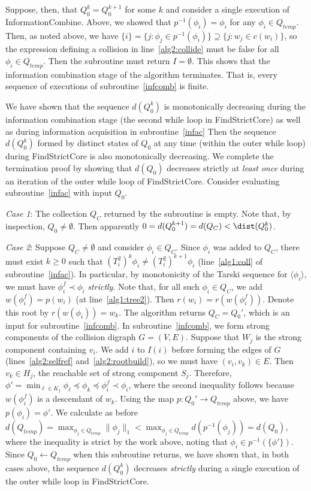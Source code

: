 \documentclass[11pt,reqno]{amsart}
\theoremstyle{definition}
\numberwithin{equation}{section}
\newcommand{\inv}{^{-1}}
\newcommand{\lag}{\langle}
\newcommand{\rag}{\rangle}
\newcommand{\pre}{\phi}
\newcommand{\peq}{\preceq}
\newcommand{\pe}{\prec}
\newcommand{\strongcomp}{S}
\newcommand{\acto}{Q_0}
\newcommand{\actok}{Q_0^k}
\newcommand{\actc}{Q_C}
\newcommand{\actt}{Q_{temp}}
\newcommand{\disto}{d}
\newcommand{\coll}{I}
\newcommand{\reach}{H}
\begin{document}
\begin{enumerate}
Suppose, then, that $\actok = \acto^{k+1}$ for some $k$ and consider a single execution of InformationCombine. 
Above, we showed that $p\inv(\pre_i) = \pre_i$ for any $\pre_i \in \actt$.
Then, as noted above, we have $\{i\} = \{j: \pre_j \in p\inv(\pre_i)\} \supseteq \{j: w_j \in c(w_i)\}$, so the expression defining a collision in line~\ref{alg2:collide} must be false for all $\pre_i \in \actt$. Then the subroutine must return $I = \emptyset$. 
This shows that the information combination stage of the algorithm terminates.
That is, every sequence of executions of subroutine~\ref{infcomb} is finite.

We have shown that the sequence $\disto(\actok)$ is monotonically decreasing during the information combination stage (the second while loop in FindStrictCore) as well as during information acquisition in subroutine~\ref{infac}
Then the sequence $\disto(\actok)$ formed by distinct states of $\acto$ at any time (within the outer while loop) during FindStrictCore is also monotonically decreasing.  
We complete the termination proof by showing that $\disto(\acto)$ decreases strictly at \emph{least once} during an iteration of the outer while loop of FindStrictCore. Consider evaluating subroutine~\ref{infac} with input $\acto$. 

\emph{Case 1}: The collection $\actc$ returned by the subroutine is empty. Note that, by inspection, $\acto \not = \emptyset$. 
Then apparently $0 = \disto(\acto^{k+1}) = \disto(\actc) < \dist(\actok)$. 

\emph{Case 2}: Suppose $\actc \not = \emptyset$ and consider $\pre_i \in \actc$.
Since $\pre_i$ was added to $\actc$, there must exist $k \geq 0$ such that $(T_i^2)^k \pre_i \not = (T_i^2)^{k+1} \pre_i$ (line~\ref{alg1:coll} of subroutine~\ref{infac}).  
In particular, by monotonicity of the Tarski sequence for $\lag \pre_i \rag$, we must have $\pre_i^f \pe \pre_i$ \emph{strictly}.
Note that, for all such $\pre_i \in \actc$, we add $w(\pre_i^f) = p(w_i)$ (at line~\ref{alg1:tree2}). Then $r(w_i) = r(w(\pre_i^f))$. Denote this root by $r(w(\pre_i))= w_k$. 
The algorithm returns $\actc = \acto'$, which is an input for subroutine~\ref{infcomb}.
In subroutine~\ref{infcomb}, we form strong components of the collision digraph $G = (V,E)$. 
Suppose that $W_j$ is the strong component containing $v_i$.
We add $i$ to $\coll(i)$ before forming the edges of $G$ (lines~\ref{alg2:selfref} and~\ref{alg2:rootbuild}), so we must have $(v_i,v_k) \in E$.
Then $v_k \in \reach_j$, the reachable set of strong component $\strongcomp_j$. 
Therefore, $\pre' = \min_{\ell \in K_j} \pre_{\ell} \peq \pre_k \peq \pre_i^f \pe \pre_i$, where the second inequality follows because $w(\pre_i^f)$ is a descendant of $w_k$. 
Using the map $p:\acto' \to \actt$ above, we have $p(\pre_i) = \pre'$.
We calculate as before $\disto(\actt) = \max_{\pre_j \in \actt} \|\pre_j\|_1 < \max_{\pre_j \in \actt} \disto(p\inv(\pre_j)) = \disto(\acto)$, where the inequality is strict by the work above, noting that $\pre_i \in p\inv(\{\pre'\})$. 
Since $\acto \leftarrow \actt$ when this subroutine returns, we have shown that, in both cases above, the sequence $\disto(\actok)$ decreases \emph{strictly} during a single execution of the outer while loop in FindStrictCore. 


\end{enumerate}
\end{document}
